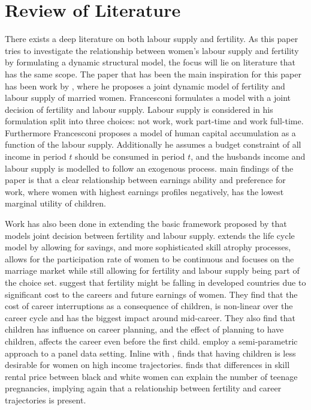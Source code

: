 \section{Review of Literature}\label{sec:lit_review}

There exists a deep literature on both labour supply and fertility.
As this paper tries to investigate the relationship between women's labour supply and fertility by formulating a dynamic  structural model, the focus will lie on literature that has the same scope. The paper that has been the main inspiration for this paper has been work by \textcite{francesconi_joint_2002}, where he proposes a joint dynamic model of fertility and labour supply of married women. Francesconi formulates a model with a joint decision of fertility and labour supply. Labour supply is considered in his formulation split into three choices: not work, work part-time and work full-time. Furthermore Francesconi proposes a model of human capital accumulation as a function of the labour supply. Additionally he assumes a budget constraint of all income in period $t$ should be consumed in period $t$, and the husbands income and labour supply is modelled to follow an exogenous process.  main findings of the paper is that a clear relationship between earnings ability and preference for work, where women with highest earnings profiles negatively, has the lowest marginal utility of children.

Work has also been done in extending the basic framework proposed by \textcite{francesconi_joint_2002} that models joint decision between fertility and labour supply.  \textcite{adda_career_2011} extends the life cycle model by allowing for savings, and more sophisticated skill atrophy processes,  \textcite{gayle_life-cyle_2006} allows for the participation rate of women to be continuous and \textcite{keane_role_2010} focuses on the marriage market while still allowing for fertility and labour supply being part of the choice set. \textcite{adda_career_2011} suggest that fertility might be falling in developed countries due to significant cost to the careers and future earnings of women. They find that the cost of career interruptions as a consequence of children, is non-linear over the career cycle and has the biggest impact around mid-career. They also find that children has influence on career planning, and the effect of planning to have children, affects the career even before the first child. \textcite{gayle_life-cyle_2006} employ a semi-parametric approach to a panel data setting. Inline with \textcite{francesconi_joint_2002}, \textcite{gayle_life-cyle_2006} finds that having children is less desirable for women on high income trajectories. \textcite{keane_role_2010} finds that differences in skill rental price between black and white women can explain the number of teenage pregnancies, implying again that a relationship between fertility and career trajectories is present.

